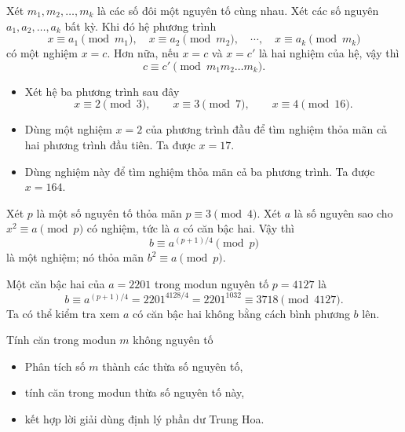 \begin{frame}
	\begin{thrm}
		Xét $m_1, m_2, \dots, m_k$ là các số đôi một nguyên tố cùng nhau. Xét các số nguyên $a_1, a_2, \dots, a_k$ bất kỳ. Khi đó hệ phương trình
		\[
		x \equiv a_1\pmod{m_1},\quad x \equiv a_2\pmod{m_2},\quad \cdots,\quad x \equiv a_k\pmod{m_k} 
		\]
		có một nghiệm $x = c$. Hơn nữa, nếu $x=c$ và $x=c'$ là hai nghiệm của hệ, vậy thì 
		$$
			c \equiv c'  \pmod{m_1 m_2 \dots m_k}.
		$$
	\end{thrm}
\end{frame}

\begin{frame}
	\begin{xmpl}
\begin{itemize}
	\item<+-> Xét hệ ba phương trình sau đây 
		\[
			x \equiv 2 \pmod{3},\qquad x\equiv 3 \pmod{7},\qquad x \equiv 4 \pmod{16}. 
		\]
		
		\item<+-> Dùng một nghiệm $x=2$ của phương trình đầu để tìm nghiệm thỏa mãn cả hai phương trình đầu tiên. Ta được $x = 17$.
 
 \item<+-> Dùng nghiệm này để tìm nghiệm thỏa mãn cả ba phương trình. Ta được $x=164$. 
\end{itemize}			
\end{xmpl}
\end{frame}

\begin{frame}
	\begin{prpstn}
		Xét $p$ là một số nguyên tố thỏa mãn $p \equiv 3 \pmod{4}$. Xét $a$ là số nguyên sao cho $x^2 \equiv a \pmod{p}$ có nghiệm, tức là $a$ có căn bậc hai. Vậy thì 
		$$
		b \equiv a^{(p+1)/4} \pmod{p}
		$$
		là một nghiệm; nó thỏa mãn $b^2 \equiv a \pmod{p}$. 
	\end{prpstn}
\end{frame}

\begin{frame}
	\begin{xmpl}
		Một căn bậc hai của $a=2201$ trong modun nguyên tố $p = 4127$ là
		\[
			b \equiv a^{(p+1)/4} = 2201^{4128/4} = 2201^{1032} \equiv 3718 \pmod{4127}. 
		\]
		Ta có thể kiểm tra xem $a$ có căn bậc hai không bằng cách bình phương $b$ lên.
	\end{xmpl}
\end{frame}
\begin{frame}{Tính căn trong modun $m$ không nguyên tố}
	\begin{itemize}
		\item<+-> Phân tích số $m$ thành các thừa số nguyên tố,
		\item<+-> tính căn trong modun thừa số nguyên tố này,  
		\item<+-> kết hợp lời giải dùng định lý phần dư Trung Hoa. 
	\end{itemize}
\end{frame}

